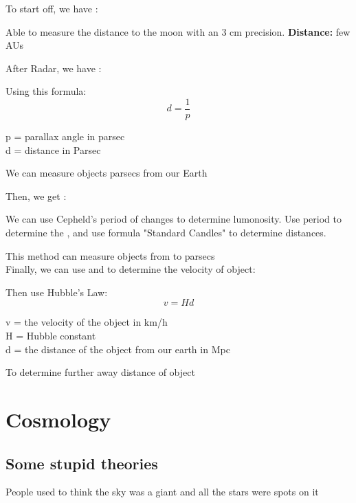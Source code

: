 To start off, we have :
\begin{redblock}
    \begin{center}
        Able to measure the distance to the moon with an 3 cm precision. \textbf{Distance: } few AUs
    \end{center}
\end{redblock}

After Radar, we have \textbf{}:
\begin{redblock}
Using this formula:
    \[
        d = \frac{1}{p}
    \]
    \begin{center}
        p = parallax angle in parsec\\
        d = distance in Parsec\\
    \end{center}
We can measure objects  parsecs from our Earth
\end{redblock}

Then, we get \textbf{}:
\begin{redblock}
    We can use Cepheld's period of changes to determine lumonosity. Use period to determine the , and use formula "Standard Candles" to determine distances.
\end{redblock}

This method can measure objects from  to  parsecs\\

Finally, we can use  and  to determine the velocity of object:
\begin{redblock}
    Then use Hubble's Law:
    \[
        v = Hd
    \]
    \begin{center}
        v = the velocity of the object in km/h\\
        H = Hubble constant\\
        d = the distance of the object from our earth in Mpc\\
    \end{center}
    To determine further away distance of object
\end{redblock}

\section{Cosmology}
\subsection{Some stupid theories}
People used to think the sky was a giant  and all the stars were spots on it
 
